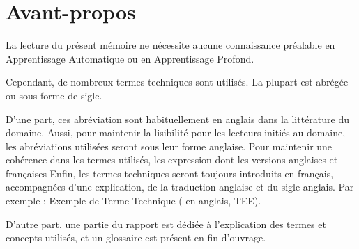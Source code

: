 \section*{Avant-propos} %
La lecture du présent mémoire ne nécessite aucune connaissance préalable en Apprentissage Automatique ou en Apprentissage Profond.

Cependant, de nombreux termes techniques sont utilisés.
La plupart est abrégée ou sous forme de sigle.

{D'une part, ces abréviation sont habituellement en anglais dans la littérature du domaine.
Aussi, pour maintenir la lisibilité pour les lecteurs initiés au domaine, les abréviations utilisées seront sous leur forme anglaise.
Pour maintenir une cohérence dans les termes utilisés, les expression dont les versions anglaises et françaises 
Enfin, les termes techniques seront toujours introduits en français, accompagnées d'une explication, de la traduction anglaise et du sigle anglais. Par exemple : Exemple de Terme Technique ( en anglais, TEE).} %

D'autre part, une partie du rapport est dédiée à l'explication des termes et concepts utilisés, et un glossaire est présent en fin d'ouvrage.

